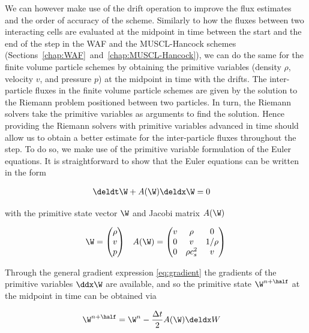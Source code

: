 We can however make use of the drift operation to improve the flux estimates and the order of
accuracy of the scheme. Similarly to how the fluxes between two interacting cells are evaluated at
the midpoint in time between the start and the end of the step in the WAF and the MUSCL-Hancock
schemes (Sections~\ref{chap:WAF}~and~\ref{chap:MUSCL-Hancock}), we can do the same for the finite
volume particle schemes by obtaining the primitive variables (density $\rho$, velocity $v$, and
pressure $p$) at the midpoint in time with the drifts. The inter-particle fluxes in the finite
volume particle schemes are given by the solution to the Riemann problem positioned between two
particles. In turn, the Riemann solvers take the primitive variables as arguments to find the
solution. Hence providing the Riemann solvers with primitive variables advanced in time should allow
us to obtain a better estimate for the inter-particle fluxes throughout the step. To do so, we make
use of the primitive variable formulation of the Euler equations. It is straightforward to show that
the Euler equations can be written in the form

\begin{align}
    \deldt \W + A(\W) \deldx \W = 0 &&
\end{align}

with the primitive state vector $\W$ and Jacobi matrix $A(\W)$

\begin{align}
    \W = \begin{pmatrix}
          \rho \\ v \\ p
         \end{pmatrix}
&&
    A(\W) = \begin{pmatrix}
              v & \rho & 0 \\
              0 & v & 1/\rho \\
              0 & \rho c_s^2 & v
             \end{pmatrix}
\end{align}

Through the general gradient expression \ref{eq:gradient} the gradients of the primitive variables
$\ddx \W$ are available, and so the primitive state $\W^{n+\half}$ at the midpoint in time can be
obtained via

\begin{align}
    \W^{n + \half} &= \W^n - \frac{\Delta t}{2} A(\W) \deldx W
\end{align}









